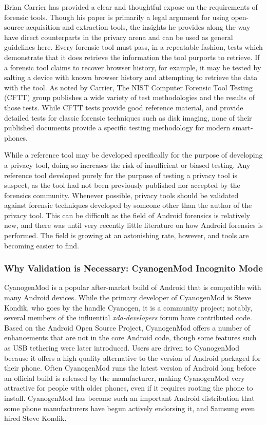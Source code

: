 Brian Carrier has provided a clear and thoughtful expose \cite{Carrier2003} on the requirements of forensic tools.  Though his paper
is primarily a legal argument for using open-source acquisition and extraction tools, the insights he provides along the way have
direct counterparts in the privacy arena and can be used as general guidelines here.  Every forensic tool must pass, in a repeatable
fashion, tests which demonstrate that it does retrieve the information the tool purports to retrieve.  If a forensic tool claims to
recover browser history, for example, it may be tested by salting a device with known browser history and attempting to retrieve the
data with the tool.  As noted by Carrier, The NIST Computer Forensic Tool Testing (CFTT) group publishes a wide variety of test
methodologies and the results of those tests.  While CFTT tests provide good reference material, and provide detailed tests for
classic forensic techniques such as disk imaging, none of their published documents provide a specific testing methodology for
modern smart-phones. 

While a reference tool may be developed specifically for the purpose of developing a privacy tool, doing so increases the risk of
insufficient or biased testing.  Any reference tool developed purely for the purpose of testing a privacy tool is suspect, as the
tool had not been previously published nor accepted by the forensics community.  Whenever possible, privacy tools should be
validated against forensic techniques developed by someone other than the author of the privacy tool.  This can be difficult as the
field of Android forensics is relatively new, and there was until very recently little literature on how Android forensics is
performed. The field is growing at an astonishing rate, however, and tools are becoming easier to find.

\subsubsection{Why Validation is Necessary: CyanogenMod Incognito Mode}

CyanogenMod is a popular after-market build of Android that is compatible with many Android devices.  While the primary developer of
CyanogenMod is Steve Kondik, who goes by the handle Cyanogen, it is a community project; notably, several members of the
influential \emph{xda-developers} forum have contributed code.  Based on the Android Open Source Project, CyanogenMod offers a
number of enhancements that are not in the core Android code, though some features such as USB tethering were later introduced.
Users are driven to CyanogenMod because it offers a high quality alternative to the version of Android packaged for their
phone.  Often CyanogenMod runs the latest version of Android long before an official build is released by the manufacturer, making
CyanogenMod very attractive for people with older phones, even if it requires rooting the phone to install.  CyanogenMod has become
such an important Android distribution that some phone manufacturers have begun actively endorsing it, and Samsung even hired Steve
Kondik.

